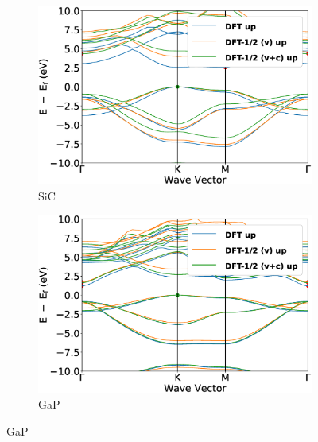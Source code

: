\begin{figure}[!ht]
\begin{subfigure}{0.45\textwidth}
  \includegraphics[width=\linewidth]{images/band_2d_sic.eps}
  \caption{SiC}
\end{subfigure}\hfil %
\begin{subfigure}{0.45\textwidth}
  \includegraphics[width=\linewidth]{images/band_2d_gap.eps}
  \caption{GaP}
\end{subfigure}\hfil %

\medskip


\end{figure}
